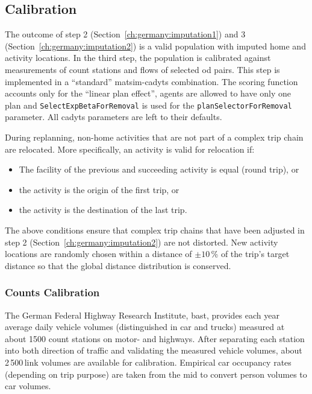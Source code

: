 \subsection{Calibration}

The outcome of step 2 (Section~\ref{ch:germany:imputation1}) and 3 (Section~\ref{ch:germany:imputation2}) is a valid population with imputed home and activity locations. In the third step, the population is calibrated against measurements of count stations and flows of selected \gls{od} pairs. This step is implemented in a ``standard'' \gls{matsim}-\gls{cadyts} combination. The scoring function accounts only for the ``linear plan effect'', agents are allowed to have only one plan and \lstinline|SelectExpBetaForRemoval| is used for the \lstinline|planSelectorForRemoval| parameter. All \gls{cadyts} parameters are left to their defaults.

During replanning, non-home activities that are not part of a complex trip chain are relocated. More specifically, an activity is valid for relocation if:
\begin{itemize}
\item The facility of the previous and succeeding activity is equal (round trip), or
\item the activity is the origin of the first trip, or
\item the activity is the destination of the last trip.
\end{itemize}
The above conditions ensure that complex trip chains that have been adjusted in step 2 (Section~\ref{ch:germany:imputation2}) are not distorted. New activity locations are randomly chosen within a distance of $\pm10$\,\% of the trip's target distance so that the global distance distribution is conserved.

\subsubsection{Counts Calibration}

The German Federal Highway Research Institute, \gls{bast}, provides each year average daily vehicle volumes (distinguished in car and trucks) measured at about 1500 count stations on motor- and highways. After separating each station into both direction of traffic and validating the measured vehicle volumes, about 2\,500\,link volumes are available for calibration. Empirical car occupancy rates (depending on trip purpose) are taken from the \gls{mid} to convert person volumes to car volumes.

